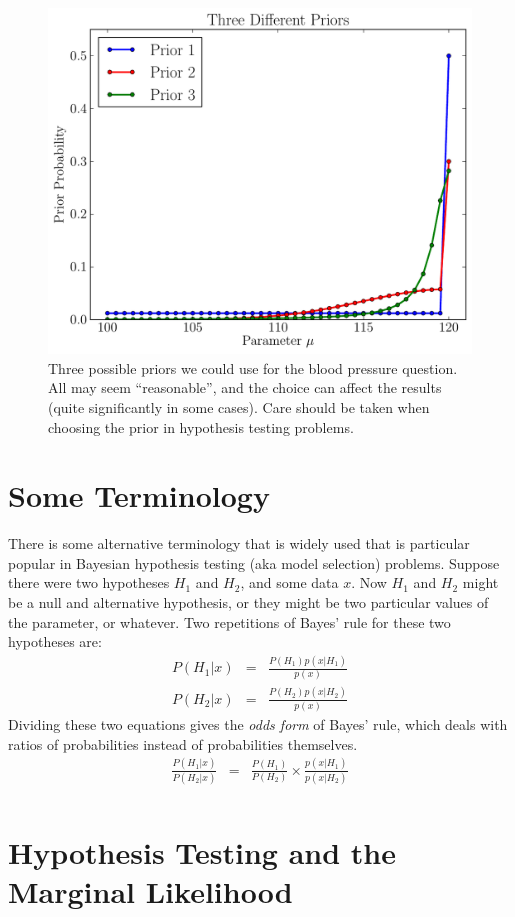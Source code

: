 \begin{figure}[ht!]
\begin{center}
\includegraphics[scale=0.6]{Figures/testing_priors.pdf}
\caption{Three possible priors we could use for the blood pressure question.
All may seem ``reasonable'', and the choice can affect the results (quite
significantly in some cases). Care should be taken when choosing the prior
in hypothesis testing problems.
\label{fig:testing_priors}}
\end{center}
\end{figure}


\section{Some Terminology}
There is some alternative terminology that is widely used that is particular
popular in Bayesian hypothesis testing (aka model selection) problems. Suppose
there were two hypotheses $H_1$ and $H_2$, and some data $x$. Now $H_1$ and
$H_2$ might be a null and alternative hypothesis, or they might be two
particular values of the parameter, or whatever. Two repetitions of Bayes' rule
for these two hypotheses are:
\begin{eqnarray}
P(H_1 | x) &=& \frac{P(H_1)p(x|H_1)}{p(x)}\\
P(H_2 | x) &=& \frac{P(H_2)p(x|H_2)}{p(x)}
\end{eqnarray}
Dividing these two equations gives the {\it odds form} of Bayes' rule, which
deals with ratios of probabilities instead of probabilities themselves.
\begin{eqnarray}
\frac{P(H_1 | x)}{P(H_2|x)} &=& \frac{P(H_1)}{P(H_2)} \times
\frac{p(x|H_1)}{p(x|H_2)}\\
\end{eqnarray}





\section{Hypothesis Testing and the Marginal Likelihood}


